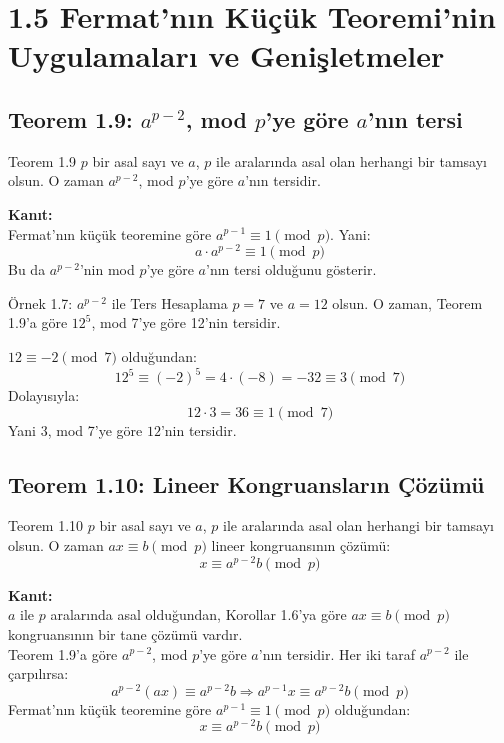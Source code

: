 \section*{1.5 Fermat'nın Küçük Teoremi'nin Uygulamaları ve Genişletmeler}

\subsection*{Teorem 1.9: $a^{p-2}$, mod $p$'ye göre $a$'nın tersi}

\begin{theorembox}{Teorem 1.9}
$p$ bir asal sayı ve $a$, $p$ ile aralarında asal olan herhangi bir tamsayı olsun. O zaman $a^{p-2}$, mod $p$'ye göre $a$'nın tersidir.

\textbf{Kanıt:}\\
Fermat'nın küçük teoremine göre $a^{p-1} \equiv 1 \pmod{p}$. Yani:
\[
a \cdot a^{p-2} \equiv 1 \pmod{p}
\]
Bu da $a^{p-2}$'nin mod $p$'ye göre $a$'nın tersi olduğunu gösterir.
\end{theorembox}

\begin{examplebox}{Örnek 1.7: $a^{p-2}$ ile Ters Hesaplama}
$p = 7$ ve $a = 12$ olsun. O zaman, Teorem 1.9'a göre $12^5$, mod 7'ye göre 12'nin tersidir.

$12 \equiv -2 \pmod{7}$ olduğundan:
\[
12^5 \equiv (-2)^5 = 4 \cdot (-8) = -32 \equiv 3 \pmod{7}
\]
Dolayısıyla:
\[
12 \cdot 3 = 36 \equiv 1 \pmod{7}
\]
Yani $3$, mod 7'ye göre $12$'nin tersidir.
\end{examplebox}

\subsection*{Teorem 1.10: Lineer Kongruansların Çözümü}

\begin{theorembox}{Teorem 1.10}
$p$ bir asal sayı ve $a$, $p$ ile aralarında asal olan herhangi bir tamsayı olsun. O zaman $ax \equiv b \pmod{p}$ lineer kongruansının çözümü:
\[
x \equiv a^{p-2}b \pmod{p}
\]

\textbf{Kanıt:}\\
$a$ ile $p$ aralarında asal olduğundan, Korollar 1.6'ya göre $ax \equiv b \pmod{p}$ kongruansının bir tane çözümü vardır.\\
Teorem 1.9'a göre $a^{p-2}$, mod $p$'ye göre $a$'nın tersidir. Her iki taraf $a^{p-2}$ ile çarpılırsa:
\[
a^{p-2}(ax) \equiv a^{p-2}b \Rightarrow a^{p-1}x \equiv a^{p-2}b \pmod{p}
\]
Fermat'nın küçük teoremine göre $a^{p-1} \equiv 1 \pmod{p}$ olduğundan:
\[
x \equiv a^{p-2}b \pmod{p}
\]
\end{theorembox}

